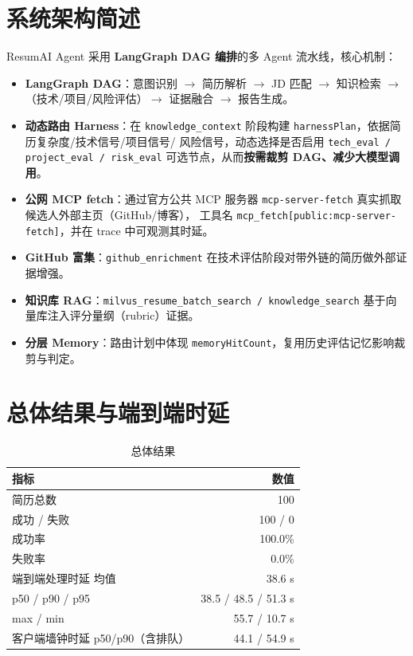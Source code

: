 \documentclass[11pt,a4paper]{ctexart}
\begin{document}
\section{系统架构简述}
ResumAI Agent 采用 \textbf{LangGraph DAG 编排}的多 Agent 流水线，核心机制：
\begin{itemize}[leftmargin=1.4em]
  \item \textbf{LangGraph DAG}：意图识别 $\to$ 简历解析 $\to$ JD 匹配 $\to$ 知识检索 $\to$（技术/项目/风险评估）$\to$ 证据融合 $\to$ 报告生成。
  \item \textbf{动态路由 Harness}：在 \texttt{knowledge\_context} 阶段构建 \texttt{harnessPlan}，依据简历复杂度/技术信号/项目信号/
  风险信号，动态选择是否启用 \texttt{tech\_eval / project\_eval / risk\_eval} 可选节点，从而\textbf{按需裁剪 DAG、减少大模型调用}。
  \item \textbf{公网 MCP fetch}：通过官方公共 MCP 服务器 \texttt{mcp-server-fetch} 真实抓取候选人外部主页（GitHub/博客），
  工具名 \texttt{mcp\_fetch[public:mcp-server-fetch]}，并在 trace 中可观测其时延。
  \item \textbf{GitHub 富集}：\texttt{github\_enrichment} 在技术评估阶段对带外链的简历做外部证据增强。
  \item \textbf{知识库 RAG}：\texttt{milvus\_resume\_batch\_search / knowledge\_search} 基于向量库注入评分量纲（rubric）证据。
  \item \textbf{分层 Memory}：路由计划中体现 \texttt{memoryHitCount}，复用历史评估记忆影响裁剪与判定。
\end{itemize}

\section{总体结果与端到端时延}
\begin{table}[H]\centering\caption{总体结果}
\begin{tabular}{l r}
\toprule
指标 & 数值 \\
\midrule
简历总数 & 100 \\
成功 / 失败 & 100 / 0 \\
成功率 & 100.0\% \\
失败率 & 0.0\% \\
端到端处理时延 均值 & 38.6 s \\
p50 / p90 / p95 & 38.5 / 48.5 / 51.3 s \\
max / min & 55.7 / 10.7 s \\
客户端墙钟时延 p50/p90（含排队）& 44.1 / 54.9 s \\
\bottomrule
\end{tabular}\end{table}
\end{document}
